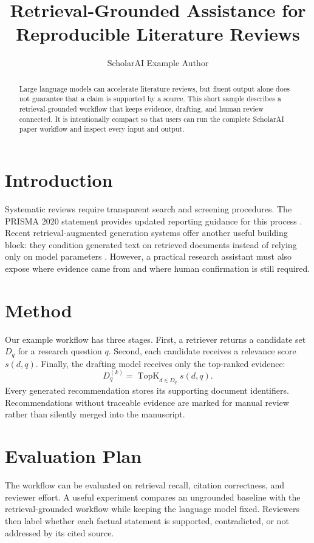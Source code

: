 \documentclass[11pt]{article}
\title{Retrieval-Grounded Assistance for Reproducible Literature Reviews}
\author{ScholarAI Example Author}
\date{}
\begin{document}
\maketitle

\begin{abstract}
Large language models can accelerate literature reviews, but fluent output alone does not guarantee that a claim is supported by a source. This short sample describes a retrieval-grounded workflow that keeps evidence, drafting, and human review connected. It is intentionally compact so that users can run the complete ScholarAI paper workflow and inspect every input and output.
\end{abstract}

\section{Introduction}
Systematic reviews require transparent search and screening procedures. The PRISMA 2020 statement provides updated reporting guidance for this process \cite{page2021prisma}. Recent retrieval-augmented generation systems offer another useful building block: they condition generated text on retrieved documents instead of relying only on model parameters \cite{lewis2020retrieval}. However, a practical research assistant must also expose where evidence came from and where human confirmation is still required.

\section{Method}
Our example workflow has three stages. First, a retriever returns a candidate set $D_q$ for a research question $q$. Second, each candidate receives a relevance score $s(d,q)$. Finally, the drafting model receives only the top-ranked evidence:
\begin{equation}
  D_q^{(k)} = \operatorname{TopK}_{d \in D_q} s(d,q).
\end{equation}
Every generated recommendation stores its supporting document identifiers. Recommendations without traceable evidence are marked for manual review rather than silently merged into the manuscript.

\section{Evaluation Plan}
The workflow can be evaluated on retrieval recall, citation correctness, and reviewer effort. A useful experiment compares an ungrounded baseline with the retrieval-grounded workflow while keeping the language model fixed. Reviewers then label whether each factual statement is supported, contradicted, or not addressed by its cited source.
\end{document}
